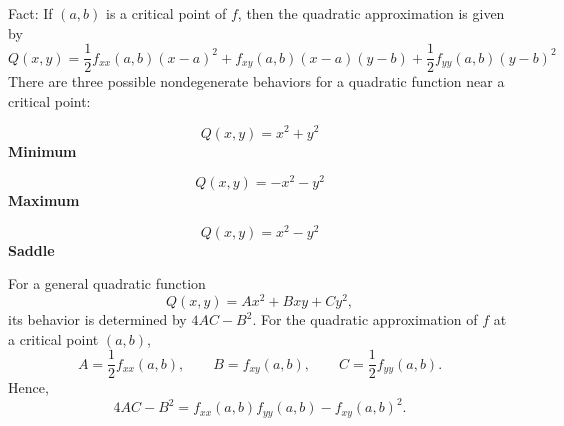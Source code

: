 Fact: If $(a, b)$ is a critical point of $f$, then the quadratic approximation is given by
\[
Q(x, y) = \frac{1}{2} f_{xx}(a, b)(x - a)^2 + f_{xy}(a, b)(x - a)(y - b) + \frac{1}{2} f_{yy}(a, b)(y - b)^2
\]
There are three possible nondegenerate behaviors for a quadratic function near a critical point:

\begin{center}
\begin{minipage}[t]{0.31\textwidth}
\centering
{}
\[
Q(x,y)=x^2 + y^2
\]
\textbf{Minimum}
\end{minipage}
\hfill
\begin{minipage}[t]{0.31\textwidth}
\centering
{}
\[
Q(x,y)=-x^2 - y^2
\]
\textbf{Maximum}
\end{minipage}
\hfill
\begin{minipage}[t]{0.31\textwidth}
\centering
{}
\[
Q(x,y)=x^2 - y^2
\]
\textbf{Saddle}
\end{minipage}
\end{center}

For a general quadratic function
\[
Q(x,y)=Ax^2 + Bxy + Cy^2,
\]
its behavior is determined by $4AC - B^2$. For the quadratic approximation of $f$ at a critical point $(a,b)$,
\[
A=\frac12 f_{xx}(a, b),\qquad
B=f_{xy}(a, b),\qquad
C=\frac12 f_{yy}(a, b).
\]
Hence,
\[
4AC-B^2=f_{xx}(a, b)f_{yy}(a, b)-f_{xy}(a, b)^2.
\]

